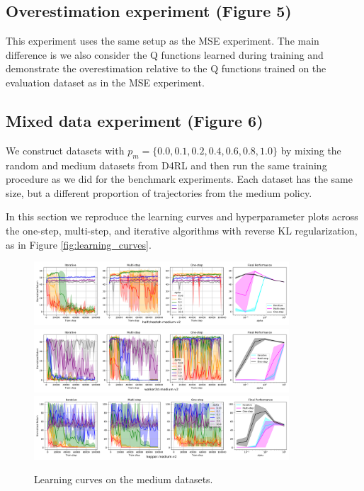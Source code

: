 \subsection{Overestimation experiment (Figure 5)}

This experiment uses the same setup as the MSE experiment. The main difference is we also consider the Q functions learned during training and demonstrate the overestimation relative to the Q functions trained on the evaluation dataset as in the MSE experiment.


\subsection{Mixed data experiment (Figure 6)}

We construct datasets with $ p_m = \{0.0, 0.1, 0.2, 0.4, 0.6, 0.8, 1.0\}$ by mixing the random and medium datasets from D4RL and then run the same training procedure as we did for the benchmark experiments. Each dataset has the same size, but a different proportion of trajectories from the medium policy.


\label{sec:app_extra_exp}

In this section we reproduce the learning curves and hyperparameter plots across the one-step, multi-step, and iterative algorithms with reverse KL regularization, as in Figure \ref{fig:learning_curves}.

\vspace{-0.2cm}
\begin{figure}[h]
    \centering
    \includegraphics[width=0.85\textwidth]{figures/offline-rl/learning curves/lc-halfcheetah-medium-v2.png}
    \includegraphics[width=0.85\textwidth]{figures/offline-rl/learning curves/lc-walker2d-medium-v2.png}
    \includegraphics[width=0.85\textwidth]{figures/offline-rl/learning curves/lc-hopper-medium-v2.png}
    \vspace{-0.2cm}
    \caption{Learning curves on the medium datasets.}
    \label{fig:app_lc_medium}
\end{figure}


